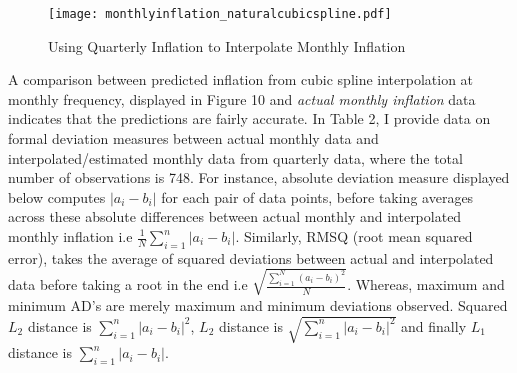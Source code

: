\documentclass[12pt]{article}
\newcommand{\1}{\mathbbm 1}
\begin{document}
	
		
		
		
		
		
		
		
		
		
		
		
		
		\begin{figure}[H]
			\begin{Center}
				\texttt{[image: monthlyinflation\_naturalcubicspline.pdf]}
				\caption{Using Quarterly Inflation to Interpolate Monthly Inflation}
			\end{Center}
		\end{figure}
		
		
		

		
			A comparison between predicted inflation from cubic spline interpolation at monthly frequency, displayed in Figure 10 and \textit{actual monthly inflation} data indicates that the predictions are fairly accurate. In Table 2, I provide data on formal deviation measures between actual monthly data and interpolated/estimated monthly data from quarterly data, where the total number of observations is 748. For instance, absolute deviation measure displayed below computes $|a_{i}-b_{i}|$ for each pair of data points, before taking averages across these absolute differences between actual monthly and interpolated monthly inflation i.e $\frac{1}{N} \sum_{i = 1}^{n} |a_{i} - b_{i}|$. Similarly, RMSQ (root mean squared error), takes the average of squared deviations between actual and interpolated data before taking a root in the end i.e $\sqrt{\frac{\sum_{i=1}^{N} (a_{i} - b_{i})^{2}}{N}}$. Whereas, maximum and minimum AD's are merely maximum and minimum deviations observed. Squared $L_{2}$ distance is $\sum_{i = 1}^{n} |a_{i} - b_{i}|^{2}$, $L_{2}$ distance is $\sqrt{\sum_{i = 1}^{n} |a_{i} - b_{i}|^{2}}$ and finally $L_{1}$ distance is $\sum_{i = 1}^{n} |a_{i} - b_{i}|$.
						
			
			
\end{document}
